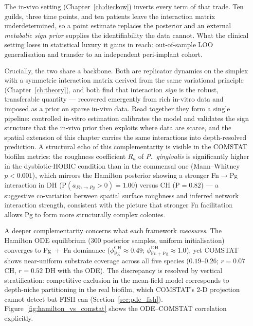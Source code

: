 The in-vivo setting (Chapter~\ref{ch:dieckow}) inverts every term of that trade.
Ten guilds, three time points, and ten patients leave the interaction matrix
underdetermined, so a point estimate replaces the posterior and an external
\emph{metabolic sign prior} supplies the identifiability the data cannot. What the
clinical setting loses in statistical luxury it gains in reach: out-of-sample LOO
generalisation and transfer to an independent peri-implant cohort.

Crucially, the two share a backbone. Both are replicator dynamics on the simplex
with a symmetric interaction matrix derived from the same variational principle
(Chapter~\ref{ch:theory}), and both find that interaction \emph{sign} is the
robust, transferable quantity --- recovered emergently from rich in-vitro data and
imposed as a prior on sparse in-vivo data. Read together they form a single
pipeline: controlled in-vitro estimation calibrates the model and validates the
sign structure that the in-vivo prior then exploits where data are scarce, and the
spatial extension of this chapter carries the same interactions into depth-resolved
prediction.
A structural echo of this complementarity is visible in the COMSTAT biofilm metrics:
the roughness coefficient $R_a$ of \textit{P.~gingivalis} is significantly higher
in the dysbiotic-HOBIC condition than in the commensal one (Mann--Whitney
$p < 0.001$), which mirrors the Hamilton posterior showing a stronger
Fn$\to$Pg interaction in DH ($\mathrm{P}(a_{Fn\to Pg}>0)=1.00$) versus CH
($\mathrm{P}=0.82$) --- a suggestive co-variation between spatial surface roughness
and inferred network interaction strength, consistent with the picture that
stronger Fn facilitation allows Pg to form more structurally complex colonies.

A deeper complementarity concerns what each framework \emph{measures}.
The Hamilton ODE equilibrium (300 posterior samples, uniform initialisation)
converges to Pg~$+$~Fn dominance
($\phi_\mathrm{Pg}^\mathrm{CH}\!\approx 0.49$; $\phi_\mathrm{Fn+Pg}^\mathrm{DH}\!\approx 1.0$),
yet COMSTAT shows near-uniform substrate coverage across all five species
($0.19$--$0.26$; $r = 0.07$ CH, $r = 0.52$ DH with the ODE).
The discrepancy is resolved by vertical stratification: competitive exclusion in the
mean-field model corresponds to depth-niche partitioning in the real biofilm,
which COMSTAT's 2-D projection cannot detect but FISH can (Section~\ref{sec:pde_fish}).
Figure~\ref{fig:hamilton_vs_comstat} shows the ODE--COMSTAT correlation explicitly.

